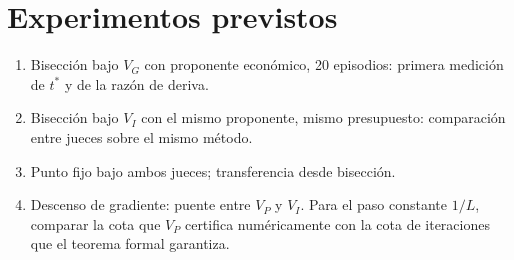 \documentclass[11pt,a4paper]{article}
\begin{document}
\section{Experimentos previstos}

\begin{enumerate}
  \item Bisección bajo $V_G$ con proponente económico, 20 episodios: primera medición de $t^*$ y de la razón de deriva.
  \item Bisección bajo $V_I$ con el mismo proponente, mismo presupuesto: comparación entre jueces sobre el mismo método.
  \item Punto fijo bajo ambos jueces; transferencia desde bisección.
  \item Descenso de gradiente: puente entre $V_P$ y $V_I$. Para el paso constante $1/L$, comparar la cota que $V_P$ certifica numéricamente con la cota de iteraciones que el teorema formal garantiza.
\end{enumerate}


\end{document}
